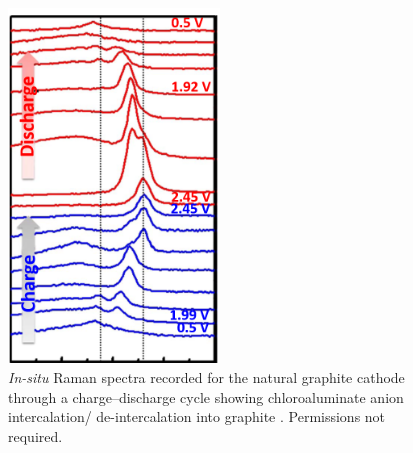 \begin{figure}[tbh!]
\centering
\includegraphics[width=0.5\textwidth]{Figures/chap2fig/Raman2}
\caption{\textit{In-situ} Raman spectra recorded for the natural graphite cathode through a charge–discharge cycle showing chloroaluminate anion intercalation/ de-intercalation into graphite \cite{wang_advanced_2017}. Permissions not required.}
\label{Figures/chap2fig:Raman2}
\end{figure}

